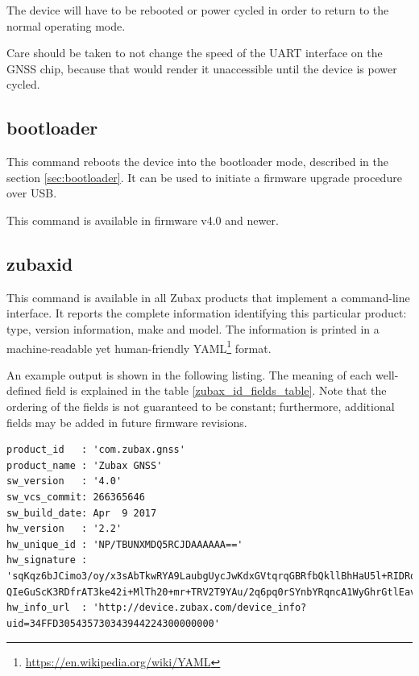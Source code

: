 \documentclass{zubaxdoc}
\begin{document}
The device will have to be rebooted or power cycled in order to return to the normal operating mode.

Care should be taken to not change the speed of the UART interface on the GNSS chip,
because that would render it unaccessible until the device is power cycled.

\subsection{bootloader}

This command reboots the device into the bootloader mode, described in the section \ref{sec:bootloader}.
It can be used to initiate a firmware upgrade procedure over USB.

This command is available in firmware v4.0 and newer.

\subsection{zubax{\textunderscore}id}\label{sec:cli_command_zubax_id}

This command is available in all Zubax products that implement a command-line interface.
It reports the complete information identifying this particular product:
type, version information, make and model.
The information is printed in a machine-readable yet human-friendly
YAML\footnote{\url{https://en.wikipedia.org/wiki/YAML}} format.

An example output is shown in the following listing.
The meaning of each well-defined field is explained in the table \ref{zubax_id_fields_table}.
Note that the ordering of the fields is not guaranteed to be constant;
furthermore, additional fields may be added in future firmware revisions.

\begin{minipage}{0.9\textwidth} %
\begin{verbatim}
product_id   : 'com.zubax.gnss'
product_name : 'Zubax GNSS'
sw_version   : '4.0'
sw_vcs_commit: 266365646
sw_build_date: Apr  9 2017
hw_version   : '2.2'
hw_unique_id : 'NP/TBUNXMDQ5RCJDAAAAAA=='
hw_signature : 'sqKqz6bJCimo3/oy/x3sAbTkwRYA9LaubgUycJwKdxGVtqrqGBRfbQkllBhHaU5l+RIDRqKnxQVSzU7
QIeGuScK3RDfrAT3ke42i+MlTh20+mr+TRV2T9YAu/2q6pq0rSYnbYRqncA1WyGhrGtlEav/K4svfL/jgwNxfE3d/YiI='
hw_info_url  : 'http://device.zubax.com/device_info?uid=34FFD305435730343944224300000000'
\end{verbatim}
\end{minipage}
\end{document}
